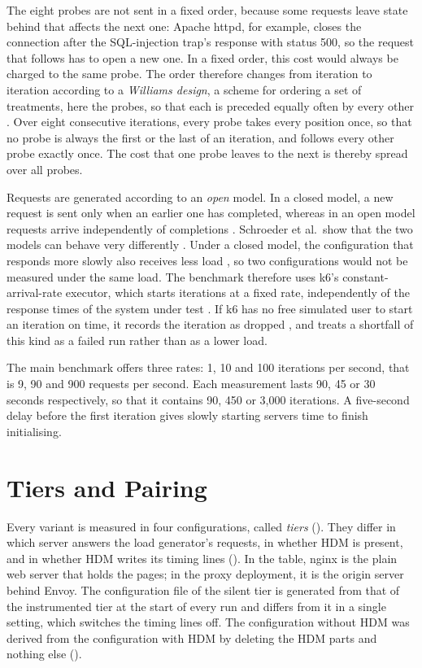 \documentclass{rptuma}
\begin{document}
The eight probes are not sent in a fixed order, because some requests leave state behind that
affects the next one: Apache httpd, for example, closes the connection after the SQL-injection
trap's response with status 500, so the request that follows has to open a new one. In a fixed
order, this cost would always be charged to the same probe. The order therefore changes from
iteration to iteration according to a \emph{Williams design}, a scheme for ordering a set of
treatments, here the probes, so that each is preceded equally often by every other
\cite{williams1949designs}. Over eight consecutive iterations, every probe takes every position
once, so that no probe is always the first or the last of an iteration, and follows every other
probe exactly once. The cost that one probe leaves to the next is thereby spread over all probes.

Requests are generated according to an \emph{open} model. In a closed model, a new request is sent
only when an earlier one has completed, whereas in an open model requests arrive independently of
completions \cite{schroeder2006open}. Schroeder et al.\ show that the two models can behave very
differently \cite{schroeder2006open}. Under a closed model, the configuration that responds more
slowly also receives less load \cite{k6_openclosed}, so two configurations would not be measured under
the same load. The
benchmark therefore uses k6's constant-arrival-rate executor, which starts iterations at a fixed
rate, independently of the response times of the system under test \cite{k6_openclosed}. If k6 has
no free simulated user to start an iteration on time, it records the iteration as dropped
\cite{k6_dropped}, and  treats a shortfall of this kind as a failed
run rather than as a lower load.

The main benchmark offers three rates: 1, 10 and 100 iterations per second, that is 9, 90 and
900 requests per second. Each measurement lasts 90, 45 or 30 seconds respectively, so that it
contains 90, 450 or 3,000 iterations. A five-second delay before the first iteration gives slowly
starting servers time to finish initialising.

\section{Tiers and Pairing}
\label{sec:method.tiers}

Every variant is measured in four configurations, called \emph{tiers}
(). They differ in which server answers the load generator's requests,
in whether HDM is present, and in whether HDM writes its timing lines ().
In the table, nginx is the plain web server that holds the pages; in the proxy deployment, it is the
origin server behind Envoy. The configuration file of the silent tier is generated from that of
the instrumented tier at the start of every run and differs from it in a single setting, which
switches the timing lines off. The configuration without HDM was derived from the configuration with
HDM by deleting the HDM parts and nothing else ().
\end{document}
